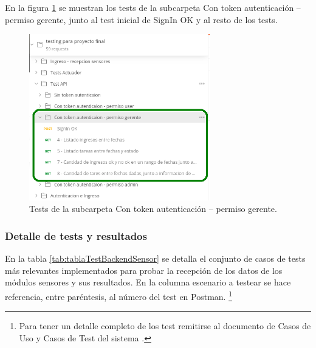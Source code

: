 En la figura \ref{fig:TestBackendGerente} se muestran los tests de la subcarpeta Con token autenticación – permiso gerente, junto al test inicial de SignIn OK y al resto de los tests.

\begin{figure}[ht]
	\centering
	\includegraphics[width=0.7\textwidth]{./Figures/TestBackendGerente.png}
	\caption{Tests de la subcarpeta Con token autenticación – permiso gerente.}
	\label{fig:TestBackendGerente}
\end{figure}

\pagebreak
\subsubsection{Detalle de tests y resultados}

En la tabla  \ref{tab:tablaTestBackendSensor} se detalla el conjunto de casos de tests más relevantes implementados para probar la recepción de los datos de los módulos sensores y sus resultados. En la columna escenario a testear se hace referencia, entre paréntesis, al número del test en Postman.  \footnote{Para tener un detalle completo de los test remitirse al documento de Casos de Uso y Casos de Test del sistema \citep{WEBSITE:CasosUsoYTest}.}


